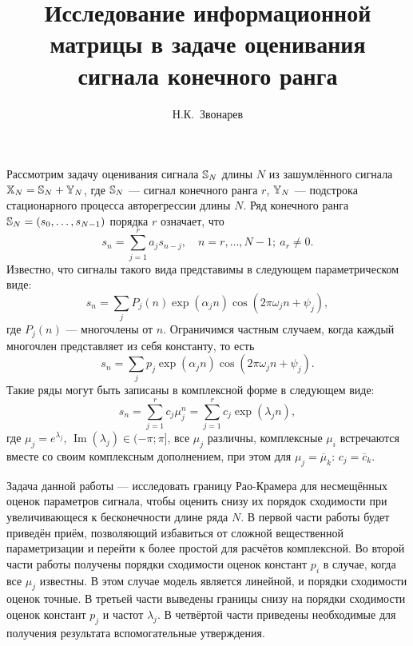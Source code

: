 \documentclass[12pt,a4paper]{article}
\begin{document}
\title{Исследование информационной матрицы в задаче оценивания сигнала конечного ранга}
\author{Н.К.~Звонарев}



\maketitle

Рассмотрим задачу оценивания сигнала $\mathbb{S}_N$ длины $N$ из зашумлённого сигнала $\mathbb{X}_N = \mathbb{S}_N + \mathbb{Y}_N$, где $\mathbb{S}_N$ --- сигнал конечного ранга $r$, $\mathbb{Y}_N$ --- подстрока стационарного процесса авторегрессии длины $N$. Ряд конечного ранга $\mathbb{S}_N = (s_0, \ldots, s_{N-1})$ порядка $r$ означает, что 
\begin{equation*}
s_n = \sum_{j = 1}^{r} a_j s_{n-j}, \quad n = r, \ldots, N - 1;\  a_r\neq 0.
\end{equation*}
Известно, что сигналы такого вида представимы в следующем параметрическом виде:
\begin{equation*} \label{task:parametricform}
s_n = \sum_j P_j(n) \exp(\alpha_j n) \cos(2 \pi \omega_j n + \psi_j),
\end{equation*}
где $P_j(n)$ --- многочлены от $n$. Ограничимся частным случаем, когда каждый многочлен представляет из себя константу, то есть
\begin{equation} \label{task:redparametricform}
s_n = \sum_j p_j \exp(\alpha_j n) \cos(2 \pi \omega_j n + \psi_j).
\end{equation}
Такие ряды могут быть записаны в комплексной форме в следующем виде:
\begin{equation} \label{task:compparametricform}
s_n = \sum_{j=1}^r c_j \mu_j^n = \sum_{j=1}^r c_j \exp(\lambda_j n),
\end{equation}
где $\mu_j = e^{\lambda_j}$, $\operatorname{Im}(\lambda_j) \in (-\pi; \pi]$, все $\mu_j$ различны, комплексные $\mu_i$ встречаются вместе со своим комплексным дополнением, при этом для $\mu_j = \overline \mu_k$: $c_j = \overline c_k$.

Задача данной работы --- исследовать границу Рао-Крамера для несмещённых оценок параметров сигнала, чтобы оценить снизу их порядок сходимости при увеличивающеся к бесконечности длине ряда $N$. В первой части работы будет приведён приём, позволяющий избавиться от сложной вещественной параметризации и перейти к более простой для расчётов комплексной. Во второй части работы получены порядки сходимости оценок констант $p_i$ в случае, когда все $\mu_j$ известны. В этом случае модель является линейной, и порядки сходимости оценок точные. В третьей части выведены границы снизу на порядки сходимости оценок констант $p_j$ и частот $\lambda_j$. В четвёртой части приведены необходимые для получения результата вспомогательные утверждения.
\end{document}
